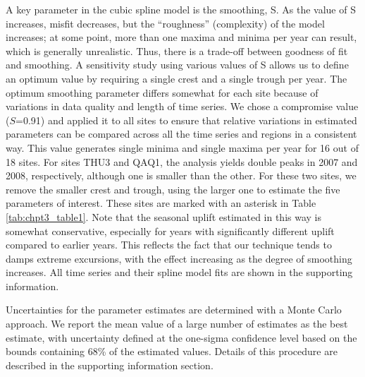 A key parameter in the cubic spline model is the smoothing, S. As the value of S increases, misfit decreases, but the “roughness” (complexity) of the model increases; at some point, more than one maxima and minima per year can result, which is generally unrealistic. Thus, there is a trade-off between goodness of fit and smoothing. A sensitivity
study using various values of S allows us to define an optimum value by requiring a single crest and a single trough per year. The optimum smoothing parameter differs somewhat for each site because of variations in data quality and length of time series. We chose a compromise value ($S$=0.91) and applied it to all sites to ensure that relative
variations in estimated parameters can be compared across all the time series and regions in a consistent way. This value generates single minima and single maxima per year for 16 out of 18 sites. For sites THU3 and QAQ1, the analysis yields double peaks in 2007 and 2008, respectively, although one is smaller than the other. For these two sites, we remove the smaller crest and trough, using the larger one to estimate the five parameters of interest. These sites are marked with an asterisk in Table \ref{tab:chpt3_table1}. Note that the seasonal uplift estimated in this way is somewhat conservative, especially for years with significantly different uplift compared to earlier years. This reflects the fact that our technique tends to damps extreme excursions, with the effect increasing as the degree of smoothing increases. All time series and their spline model fits are shown in the supporting information.

Uncertainties for the parameter estimates are determined with a Monte Carlo approach. We report the mean value of a large number of estimates as the best estimate, with uncertainty defined at the one-sigma confidence level based on the bounds containing 68\% of the estimated values. Details of this procedure are described in the supporting information section.

